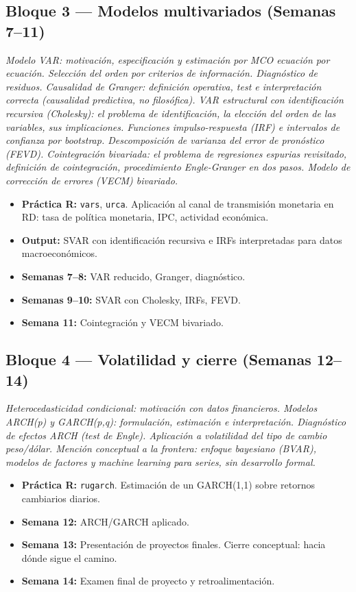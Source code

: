 \documentclass[11pt,letterpaper]{article}
\begin{document}
\subsection*{Bloque 3 --- Modelos multivariados (Semanas 7--11)}

\emph{Modelo VAR: motivación, especificación y estimación por MCO ecuación por ecuación. Selección del orden por criterios de información. Diagnóstico de residuos. Causalidad de Granger: definición operativa, test e interpretación correcta (causalidad predictiva, no filosófica). VAR estructural con identificación recursiva (Cholesky): el problema de identificación, la elección del orden de las variables, sus implicaciones. Funciones impulso-respuesta (IRF) e intervalos de confianza por bootstrap. Descomposición de varianza del error de pronóstico (FEVD). Cointegración bivariada: el problema de regresiones espurias revisitado, definición de cointegración, procedimiento Engle-Granger en dos pasos. Modelo de corrección de errores (VECM) bivariado.}

\begin{itemize}[leftmargin=*, itemsep=0.2em]
  \item \textbf{Práctica R:} \texttt{vars}, \texttt{urca}. Aplicación al canal de transmisión monetaria en RD: tasa de política monetaria, IPC, actividad económica.
  \item \textbf{Output:} SVAR con identificación recursiva e IRFs interpretadas para datos macroeconómicos.
  \item \textbf{Semanas 7--8:} VAR reducido, Granger, diagnóstico.
  \item \textbf{Semanas 9--10:} SVAR con Cholesky, IRFs, FEVD.
  \item \textbf{Semana 11:} Cointegración y VECM bivariado.
\end{itemize}

\subsection*{Bloque 4 --- Volatilidad y cierre (Semanas 12--14)}

\emph{Heterocedasticidad condicional: motivación con datos financieros. Modelos ARCH(p) y GARCH(p,q): formulación, estimación e interpretación. Diagnóstico de efectos ARCH (test de Engle). Aplicación a volatilidad del tipo de cambio peso/dólar. Mención conceptual a la frontera: enfoque bayesiano (BVAR), modelos de factores y machine learning para series, sin desarrollo formal.}

\begin{itemize}[leftmargin=*, itemsep=0.2em]
  \item \textbf{Práctica R:} \texttt{rugarch}. Estimación de un GARCH(1,1) sobre retornos cambiarios diarios.
  \item \textbf{Semana 12:} ARCH/GARCH aplicado.
  \item \textbf{Semana 13:} Presentación de proyectos finales. Cierre conceptual: hacia dónde sigue el camino.
  \item \textbf{Semana 14:} Examen final de proyecto y retroalimentación.
\end{itemize}
\end{document}
